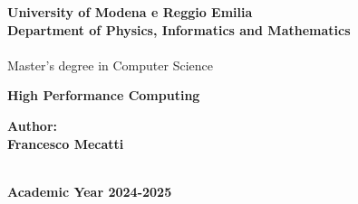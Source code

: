 \documentclass[12pt,a4paper,twoside,onecolumn,openright]{book}
\begin{document}
\begin{sloppypar}

\begin{titlepage}
\begin{center} {
    \large
    \textbf{University of Modena e Reggio Emilia} \\
     \textbf{Department of Physics, Informatics and Mathematics} \\
    \hspace*{0cm} \hrulefill \hspace*{0cm} \\
    Master's degree in Computer Science
    
    \begin{spacing}{1}
        \huge{\bf High Performance Computing}
    \end{spacing}
}
\vspace{3mm}
\end{center}

\vspace{40mm}
\par
\noindent
\hfill
\begin{minipage}[t]{0.47\textwidth}\raggedleft
{\large{\bf Author:\\ Francesco Mecatti}}
\end{minipage}
\vspace{10mm}

\begin{center}
\hspace*{0cm} \hrulefill \hspace*{0cm} \\
\vspace{5mm}
{\large{\bf Academic Year 2024-2025}}
\end{center}
\end{titlepage}

\setlength{\parindent}{0pt}
\setlength{\parskip}{1ex plus 0.5ex minus 0.2ex}
\frontmatter
\mainmatter

\newcommand{\whitepage}{\hbox{}\thispagestyle{empty}\newpage}

\renewcommand{\contentsname}{Table of Contents} \tableofcontents






\end{sloppypar}
\end{document}

